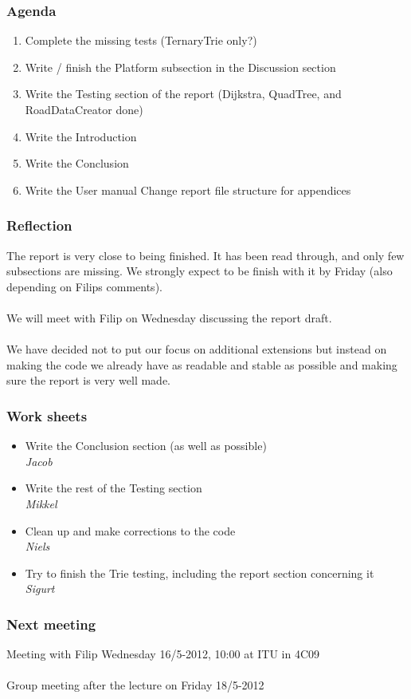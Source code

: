\subsubsection*{Agenda}
\begin{enumerate}
	\item Complete the missing tests (TernaryTrie only?)
	\item Write / finish the Platform subsection in the Discussion section
	\item Write the Testing section of the report (Dijkstra, QuadTree, and RoadDataCreator done)
	\item Write the Introduction
	\item Write the Conclusion
	\item Write the User manual
Change report file structure for appendices
\end{enumerate}

\subsubsection*{Reflection}
The report is very close to being finished. It has been read through, and only few subsections are missing. We strongly expect to be finish with it by Friday (also depending on Filips comments). \\ \\
We will meet with Filip on Wednesday discussing the report draft. \\ \\
We have decided not to put our focus on additional extensions but instead on making the code we already have as readable and stable as possible and making sure the report is very well made.

\subsubsection*{Work sheets}
\begin{itemize}
	\item Write the Conclusion section (as well as possible) \\
		\textsl{Jacob}
	\item Write the rest of the Testing section \\
		\textsl{Mikkel}
	\item Clean up and make corrections to the code \\
		\textsl{Niels}
	\item Try to finish the Trie testing, including the report section concerning it \\
		\textsl{Sigurt}
\end{itemize}

\subsubsection*{Next meeting}
Meeting with Filip Wednesday 16/5-2012, 10:00 at ITU in 4C09 \\ \\
Group meeting after the lecture on Friday 18/5-2012
